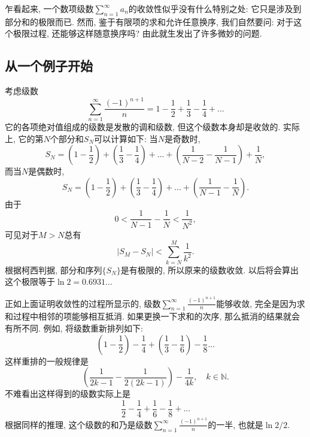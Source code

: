

乍看起来, 一个数项级数$\sum_{n=1}^\infty a_n$的收敛性似乎没有什么特别之处: 它只是涉及到部分和的极限而已. 然而, 鉴于有限项的求和允许任意换序, 我们自然要问: 对于这个极限过程, 还能够这样随意换序吗? 由此就生发出了许多微妙的问题.

\subsection{从一个例子开始}

考虑级数
$$
\sum_{n=1}^\infty\frac{(-1)^{n+1}}{n}
=1-\frac{1}{2}+\frac{1}{3}-\frac{1}{4}+...
$$
它的各项绝对值组成的级数是发散的调和级数, 但这个级数本身却是收敛的. 实际上, 它的第$N$个部分和$S_N$可以计算如下: 当$N$是奇数时,
$$
S_N=\left(1-\frac{1}{2}\right)+\left(\frac{1}{3}-\frac{1}{4}\right)+...+\left(\frac{1}{N-2}-\frac{1}{N-1}\right)+\frac{1}{N},
$$
而当$N$是偶数时,
$$
S_N=\left(1-\frac{1}{2}\right)+\left(\frac{1}{3}-\frac{1}{4}\right)+...+\left(\frac{1}{N-1}-\frac{1}{N}\right).
$$
由于
$$
0<\frac{1}{N-1}-\frac{1}{N}<\frac{1}{N^2},
$$
可见对于$M>N$总有
$$
|S_M-S_N|<\sum_{k=N}^M\frac{1}{k^2}.
$$
根据柯西判据, 部分和序列$\{S_N\}$是有极限的, 所以原来的级数收敛. 以后将会算出这个极限等于$\ln2=0.6931...$

正如上面证明收敛性的过程所显示的, 级数$\sum_{n=1}^\infty\frac{(-1)^{n+1}}{n}$能够收敛, 完全是因为求和过程中相邻的项能够相互抵消. 如果更换一下求和的次序, 那么抵消的结果就会有所不同. 例如, 将级数重新排列如下:
$$
\left(1-\frac{1}{2}\right)-\frac{1}{4}+\left(\frac{1}{3}-\frac{1}{6}\right)-\frac{1}{8}...
$$
这样重排的一般规律是
$$
\left(\frac{1}{2k-1}-\frac{1}{2(2k-1)}\right)-\frac{1}{4k},
\quad k\in\mathbb{N}.
$$
不难看出这样得到的级数实际上是
$$
\frac{1}{2}-\frac{1}{4}+\frac{1}{6}-\frac{1}{8}+...
$$
根据同样的推理, 这个级数的和乃是级数$\sum_{n=1}^\infty\frac{(-1)^{n+1}}{n}$的一半, 也就是$\ln2/2$.